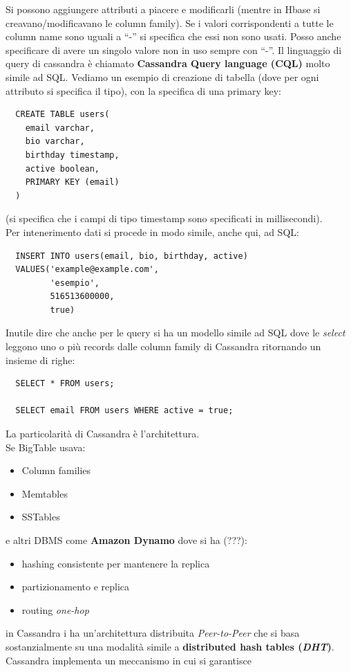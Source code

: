 \documentclass[a4paper,12pt, oneside]{book}
\begin{document}
Si possono aggiungere attributi a piacere e modificarli (mentre in Hbase si
creavano/modificavano le column family). Se i valori corrispondenti a tutte le
column name sono uguali a ``-'' si specifica che essi non sono usati. Posso
anche specificare di avere un singolo valore non in uso sempre con ``-''.
\newpage
Il linguaggio di query di cassandra è chiamato \textbf{Cassandra Query language
  (CQL)} molto simile ad SQL. Vediamo un esempio di creazione di tabella (dove
per ogni attributo si specifica il tipo), con la
specifica di una primary key:
\begin{verbatim}
  CREATE TABLE users(
    email varchar,
    bio varchar,
    birthday timestamp,
    active boolean,
    PRIMARY KEY (email)
  )
\end{verbatim}
(si specifica che i campi di tipo timestamp sono specificati in millisecondi).\\
Per intenerimento dati si procede in modo simile, anche qui, ad SQL:
\begin{verbatim}
  INSERT INTO users(email, bio, birthday, active)
  VALUES('example@example.com',
         'esempio',
         516513600000,
         true)
\end{verbatim}
Inutile dire che anche per le query si ha un modello simile ad SQL dove le
\textit{select} leggono uno o più records dalle column family di Cassandra
ritornando un insieme di righe:
\begin{verbatim}
  SELECT * FROM users;

  SELECT email FROM users WHERE active = true;
\end{verbatim}
La particolarità di Cassandra è l'architettura.\\
Se BigTable usava:
\begin{itemize}
  \item Column families
  \item Memtables
  \item SSTables
\end{itemize}
e altri DBMS come \textbf{Amazon Dynamo} dove si ha (???):
\begin{itemize}
  \item hashing consistente per mantenere la replica
  \item partizionamento e replica
  \item routing \textit{one-hop}
\end{itemize}
in Cassandra i ha un'architettura distribuita \textit{Peer-to-Peer} che si basa
sostanzialmente su una modalità simile a \textbf{distributed hash tables
  (\textit{DHT})}. Cassandra  implementa un meccanismo in cui si garantisce
\end{document}
